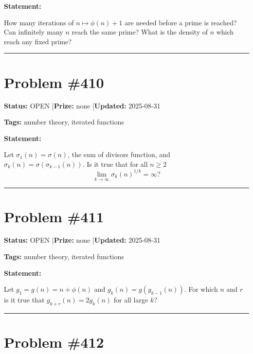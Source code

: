 \documentclass{article}
\begin{document}
\medskip

\noindent\textbf{Statement:}

How many iterations of $n\mapsto \phi(n)+1$ are needed before a prime is reached? Can infinitely many $n$ reach the same prime? What is the density of $n$ which reach any fixed prime?

\noindent\rule{\linewidth}{0.4pt}


\section{Problem \#410}
\label{prob:410}

\noindent\textbf{Status:} OPEN \quad|\quad \textbf{Prize:} none \quad|\quad \textbf{Updated:} 2025-08-31

\noindent\textbf{Tags:} number theory, iterated functions

\medskip

\noindent\textbf{Statement:}

Let $\sigma_1(n)=\sigma(n)$, the sum of divisors function, and $\sigma_k(n)=\sigma(\sigma_{k-1}(n))$. Is it true that for all $n\geq 2$\[\lim_{k\to \infty} \sigma_k(n)^{1/k}=\infty?\]

\noindent\rule{\linewidth}{0.4pt}


\section{Problem \#411}
\label{prob:411}

\noindent\textbf{Status:} OPEN \quad|\quad \textbf{Prize:} none \quad|\quad \textbf{Updated:} 2025-08-31

\noindent\textbf{Tags:} number theory, iterated functions

\medskip

\noindent\textbf{Statement:}

Let $g_1=g(n)=n+\phi(n)$ and $g_k(n)=g(g_{k-1}(n))$. For which $n$ and $r$ is it true that $g_{k+r}(n)=2g_k(n)$ for all large $k$?

\noindent\rule{\linewidth}{0.4pt}


\section{Problem \#412}
\label{prob:412}
\end{document}
